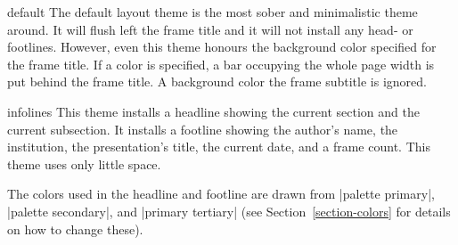 \begin{outerthemeexample}{default}
  The default layout theme is the most sober and minimalistic theme
  around. It will flush left the frame title and it will not install
  any head- or footlines. However, even this theme honours the
  background color specified for the frame title. If a color is
  specified, a bar occupying the whole page width is put behind the
  frame title. A background color the frame subtitle is ignored.
\end{outerthemeexample}

\begin{outerthemeexample}{infolines}
  This theme installs a headline showing the current section and the
  current subsection. It installs a footline showing the author's
  name, the institution, the presentation's title, the current date,
  and a frame count. This theme uses only little space.

  The colors used in the headline and footline are drawn from
  |palette primary|, |palette secondary|, and |primary tertiary| (see
  Section~\ref{section-colors} for details on how to change these).
\end{outerthemeexample}


